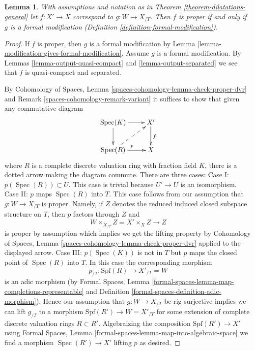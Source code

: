 \documentclass{stacks-project}
\theoremstyle{plain}
\newtheorem{lemma}[subsection]{Lemma}
\theoremstyle{definition}
\theoremstyle{remark}
\numberwithin{equation}{subsection}
\def\Spec{\mathop{\mathrm{Spec}}}
\begin{document}
\begin{lemma}
\label{lemma-output-proper}
With assumptions and notation as in Theorem \ref{theorem-dilatations-general}
let $f : X' \to X$ correspond to $g : W \to X_{/T}$.
Then $f$ is proper if and only if $g$ is a formal modification
(Definition \ref{definition-formal-modification}).
\end{lemma}

\begin{proof}
If $f$ is proper, then $g$ is a formal modification by
Lemma \ref{lemma-modification-gives-formal-modification}.
Assume $g$ is a formal modification. By
Lemmas \ref{lemma-output-quasi-compact} and \ref{lemma-output-separated}
we see that $f$ is quasi-compact and separated.

\medskip\noindent
By Cohomology of Spaces, Lemma \ref{spaces-cohomology-lemma-check-proper-dvr}
and Remark \ref{spaces-cohomology-remark-variant}
it suffices to show that given any commutative diagram
$$
\xymatrix{
\Spec(K) \ar[r] \ar[d] & X' \ar[d]^f \\
\Spec(R) \ar[r]^p \ar@{-->}[ru] & X
}
$$
where $R$ is a complete discrete valuation ring with fraction field $K$,
there is a dotted arrow making the diagram commute.
There are three cases:
Case I: $p(\Spec(R)) \subset U$. This case is trivial
because $U' \to U$ is an isomorphism.
Case II: $p$ maps $\Spec(R)$ into $T$. This case follows
from our assumption that $g : W \to X_{/T}$ is proper. Namely,
if $Z$ denotes the reduced induced closed subspace structure
on $T$, then $p$ factors through $Z$ and
$$
W \times_{X_{/T}} Z = X' \times_X Z \longrightarrow Z
$$
is proper by assumption which implies we get the lifting property by
Cohomology of Spaces, Lemma \ref{spaces-cohomology-lemma-check-proper-dvr}
applied to the displayed arrow. Case III: $p(\Spec(K))$ is not in $T$
but $p$ maps the closed point of $\Spec(R)$ into $T$. In this case
the corresponding morphism
$$
p_{/T} : \text{Spf}(R) \longrightarrow X'_{/T} = W
$$
is an adic morphism (by
Formal Spaces, Lemma
\ref{formal-spaces-lemma-map-completions-representable} and
Definition \ref{formal-spaces-definition-adic-morphism}).
Hence our assumption that $g : W \to X_{/T}$ be rig-surjective
implies we can lift $g_{/T}$ to a morphism
$\text{Spf}(R') \to W = X'_{/T}$
for some extension of complete discrete valuation rings $R \subset R'$.
Algebraizing the composition $\text{Spf}(R') \to X'$ using
Formal Spaces, Lemma \ref{formal-spaces-lemma-map-into-algebraic-space}
we find a morphism $\Spec(R') \to X'$ lifting $p$ as desired.
\end{proof}
\end{document}

